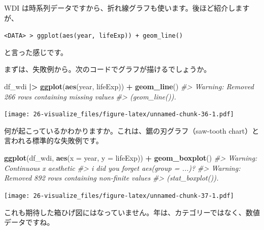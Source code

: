 \documentclass[
  xelatex, ja=standard]{bxjsbook}
\newenvironment{Shaded}{\begin{snugshade}}{\end{snugshade}}
\newcommand{\AttributeTok}[1]{\textcolor[rgb]{0.13,0.29,0.53}{#1}}
\newcommand{\CommentTok}[1]{\textcolor[rgb]{0.56,0.35,0.01}{\textit{#1}}}
\newcommand{\FunctionTok}[1]{\textcolor[rgb]{0.13,0.29,0.53}{\textbf{#1}}}
\newcommand{\NormalTok}[1]{#1}
\newcommand{\SpecialCharTok}[1]{\textcolor[rgb]{0.81,0.36,0.00}{\textbf{#1}}}
\theoremstyle{definition}
\theoremstyle{definition}
\theoremstyle{definition}
\theoremstyle{definition}
\theoremstyle{remark}
\begin{document}
WDI は時系列データですから、折れ線グラフも使います。後ほど紹介しますが、

\texttt{\textless{}DATA\textgreater{}\ \textbar{}\textgreater{}\ ggplot(aes(year,\ lifeExp))\ +\ geom\_line()}

と言った感じです。

まずは、失敗例から。次のコードでグラフが描けるでしょうか。

\begin{Shaded}
\begin{Highlighting}[]
\NormalTok{df\_wdi }\SpecialCharTok{|\textgreater{}} \FunctionTok{ggplot}\NormalTok{(}\FunctionTok{aes}\NormalTok{(year, lifeExp)) }\SpecialCharTok{+} \FunctionTok{geom\_line}\NormalTok{()}
\CommentTok{\#\textgreater{} Warning: Removed 266 rows containing missing values}
\CommentTok{\#\textgreater{} (\textasciigrave{}geom\_line()\textasciigrave{}).}
\end{Highlighting}
\end{Shaded}

\texttt{[image: 26-visualize\_files/figure-latex/unnamed-chunk-36-1.pdf]}

何が起こっているかわかりますか。これは、鋸の刃グラフ（saw-tooth chart）と言われる標準的な失敗例です。

\begin{Shaded}
\begin{Highlighting}[]
\FunctionTok{ggplot}\NormalTok{(df\_wdi, }\FunctionTok{aes}\NormalTok{(}\AttributeTok{x =}\NormalTok{ year, }\AttributeTok{y =}\NormalTok{ lifeExp)) }\SpecialCharTok{+} \FunctionTok{geom\_boxplot}\NormalTok{()}
\CommentTok{\#\textgreater{} Warning: Continuous x aesthetic}
\CommentTok{\#\textgreater{} i did you forget \textasciigrave{}aes(group = ...)\textasciigrave{}?}
\CommentTok{\#\textgreater{} Warning: Removed 892 rows containing non{-}finite values}
\CommentTok{\#\textgreater{} (\textasciigrave{}stat\_boxplot()\textasciigrave{}).}
\end{Highlighting}
\end{Shaded}

\texttt{[image: 26-visualize\_files/figure-latex/unnamed-chunk-37-1.pdf]}

これも期待した箱ひげ図にはなっていません。年は、カテゴリーではなく、数値データですね。

\begin{Shaded}
\end{Shaded}
\end{document}
